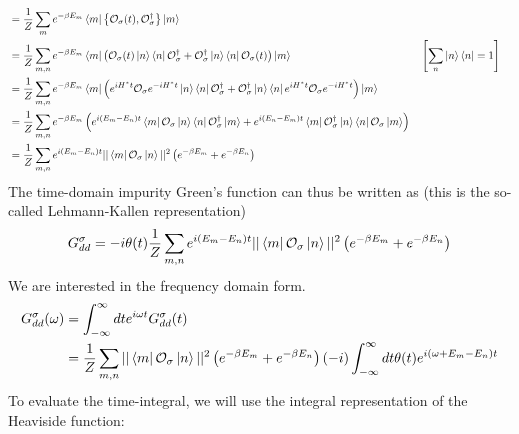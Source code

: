 \documentclass{report}
\numberwithin{equation}{section}
\begin{document}
\begin{appendices}
\begin{equation}
\begin{aligned}
	&= \frac{1}{Z}\sum_{m}e^{-\beta E_m}\bra{m}\left\{ \mathcal{O}_{\sigma}(t),\mathcal{O}^\dagger_{\sigma} \right\} \ket{m}\\
	&= \frac{1}{Z}\sum_{m,n}e^{-\beta E_m}\bra{m}\left( \mathcal{O}_{\sigma}(t)\ket{n}\bra{n}\mathcal{O}^\dagger_{\sigma} + \mathcal{O}^\dagger_{\sigma}\ket{n}\bra{n}\mathcal{O}_{\sigma}(t)\right) \ket{m} && \left[\sum_n \ket{n}\bra{n} = 1\right]  \\
	&= \frac{1}{Z}\sum_{m,n}e^{-\beta E_m}\bra{m}\left( e^{iH^* t}\mathcal{O}_{\sigma}e^{-iH^* t}\ket{n}\bra{n}\mathcal{O}^\dagger_{\sigma} + \mathcal{O}^\dagger_{\sigma}\ket{n}\bra{n}e^{iH^* t}\mathcal{O}_{\sigma}e^{-iH^* t}\right) \ket{m}\\
	&= \frac{1}{Z}\sum_{m,n}e^{-\beta E_m}\left( e^{i\left( E_m - E_n \right)  t}\bra{m}\mathcal{O}_{\sigma}\ket{n}\bra{n}\mathcal{O}^\dagger_{\sigma} \ket{m} + e^{i\left( E_n - E_m \right)  t}\bra{m}\mathcal{O}^\dagger_{\sigma}\ket{n}\bra{n}\mathcal{O}_{\sigma} \ket{m}\right)\\
	&= \frac{1}{Z}\sum_{m,n}e^{i\left( E_m - E_n \right)  t}||\bra{m}\mathcal{O}_{\sigma}\ket{n}||^2\left( e^{-\beta E_m} + e^{-\beta E_n}\right)\\
\end{aligned}\end{equation}
The time-domain impurity Green's function can thus be written as (this is the so-called Lehmann-Kallen representation)
\begin{equation}\begin{aligned}
	G_{dd}^\sigma = -i\theta(t)\frac{1}{Z}\sum_{m,n}e^{i\left( E_m - E_n \right)  t}||\bra{m}\mathcal{O}_{\sigma}\ket{n}||^2\left( e^{-\beta E_m} + e^{-\beta E_n}\right)\\
\end{aligned}\end{equation}
We are interested in the frequency domain form.
\begin{equation}\begin{aligned}
	G_{d d}^\sigma(\omega) &= \int_{-\infty}^\infty dt e^{i \omega t}G_{d d}^\sigma(t) \\
			       &= \frac{1}{Z}\sum_{m,n}||\bra{m}\mathcal{O}_{\sigma}\ket{n}||^2\left( e^{-\beta E_m} + e^{-\beta E_n}\right)\left(-i\right)\int_{-\infty}^\infty dt \theta(t)e^{i\left( \omega + E_m - E_n \right)t}
\end{aligned}\end{equation}
To evaluate the time-integral, we will use the integral representation of the Heaviside function:
\begin{equation}\begin{aligned}

\end{aligned}
\end{equation}
\end{appendices}
\end{document}
